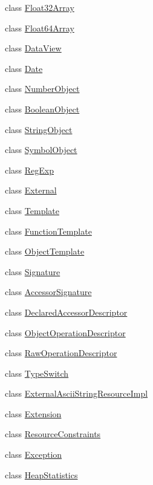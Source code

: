 \begin{DoxyCompactItemize}
class \hyperlink{classv8_1_1Float32Array}{Float32\-Array}
\item 
class \hyperlink{classv8_1_1Float64Array}{Float64\-Array}
\item 
class \hyperlink{classv8_1_1DataView}{Data\-View}
\item 
class \hyperlink{classv8_1_1Date}{Date}
\item 
class \hyperlink{classv8_1_1NumberObject}{Number\-Object}
\item 
class \hyperlink{classv8_1_1BooleanObject}{Boolean\-Object}
\item 
class \hyperlink{classv8_1_1StringObject}{String\-Object}
\item 
class \hyperlink{classv8_1_1SymbolObject}{Symbol\-Object}
\item 
class \hyperlink{classv8_1_1RegExp}{Reg\-Exp}
\item 
class \hyperlink{classv8_1_1External}{External}
\item 
class \hyperlink{classv8_1_1Template}{Template}
\item 
class \hyperlink{classv8_1_1FunctionTemplate}{Function\-Template}
\item 
class \hyperlink{classv8_1_1ObjectTemplate}{Object\-Template}
\item 
class \hyperlink{classv8_1_1Signature}{Signature}
\item 
class \hyperlink{classv8_1_1AccessorSignature}{Accessor\-Signature}
\item 
class \hyperlink{classv8_1_1DeclaredAccessorDescriptor}{Declared\-Accessor\-Descriptor}
\item 
class \hyperlink{classv8_1_1ObjectOperationDescriptor}{Object\-Operation\-Descriptor}
\item 
class \hyperlink{classv8_1_1RawOperationDescriptor}{Raw\-Operation\-Descriptor}
\item 
class \hyperlink{classv8_1_1TypeSwitch}{Type\-Switch}
\item 
class \hyperlink{classv8_1_1ExternalAsciiStringResourceImpl}{External\-Ascii\-String\-Resource\-Impl}
\item 
class \hyperlink{classv8_1_1Extension}{Extension}
\item 
class \hyperlink{classv8_1_1ResourceConstraints}{Resource\-Constraints}
\item 
class \hyperlink{classv8_1_1Exception}{Exception}
\item 
class \hyperlink{classv8_1_1HeapStatistics}{Heap\-Statistics}
\item 

\end{DoxyCompactItemize}
